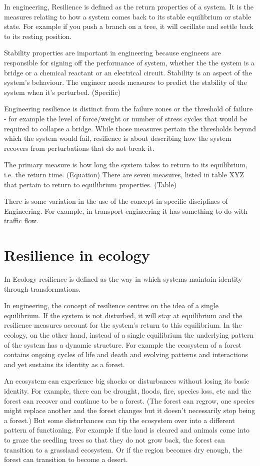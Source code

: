 In engineering, Resilience is defined as the return properties of a system. 
It is the measures relating to how a system comes back to its stable equilibrium or stable state. For example if you push a branch on a tree, it will oscillate and settle back to its resting position. 

Stability properties are important in engineering because engineers are responsible for signing off the performance of system, whether the the system is a bridge or a chemical reactant or an electrical circuit. Stability is an aspect of the system's behaviour. The engineer needs measures to predict the stability of the system when it's perturbed. (Specific) 

Engineering resilience is distinct from the failure zones or the threshold of failure - for example the level of force/weight or number of stress cycles that would be required to collapse a bridge. While those measures pertain the thresholds beyond which the system would fail, resilience is about describing how the system recovers from perturbations that do not break it. 

The primary measure is how long the system takes to return to its equilibrium, i.e. the return time. (Equation) There are seven measures, listed in table XYZ that pertain to return to equilibrium properties.  (Table)

There is some variation in the use of the concept in specific disciplines of Engineering. For example, in transport engineering it has something to do with traffic flow.

\section{Resilience in ecology}

In Ecology resilience is defined as the way in which systems maintain identity through transformations. 

In engineering, the concept of resilience centres on the idea of a single equilibrium. If the system is not disturbed, it will stay at equilibrium and the resilience measures account for the system's return to this equilibrium. In the ecology, on the other hand, instead of a single equilibrium the underlying pattern of the system has a dynamic structure. For example the ecosystem of a forest contains ongoing cycles of life and death and evolving patterns and interactions and yet sustains its identity as a forest. 

An ecosystem can experience big shocks or disturbances without losing its basic identity. For example, there can be drought, floods, fire, species loss, etc and the forest can recover and continue to be a forest. (The forest can regrow, one species might replace another and the forest changes but it doesn't necessarily stop being a forest.) But some disturbances can tip the ecosystem over into a different pattern of functioning. For example if the land is cleared and animals come into to graze the seedling trees so that they do not grow back, the forest can transition to a grassland ecosystem. Or if the region becomes dry enough, the forest can transition to become a desert. 

